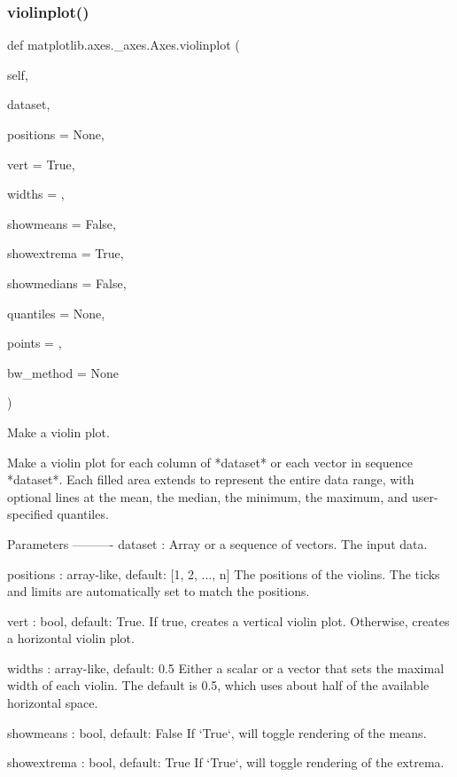 \begin{DoxyVerb}
\subsubsection{\texorpdfstring{violinplot()}{violinplot()}}
{\footnotesize\ttfamily def matplotlib.\+axes.\+\_\+axes.\+Axes.\+violinplot (\begin{DoxyParamCaption}\item[{}]{self,  }\item[{}]{dataset,  }\item[{}]{positions = {\ttfamily None},  }\item[{}]{vert = {\ttfamily True},  }\item[{}]{widths = {},  }\item[{}]{showmeans = {\ttfamily False},  }\item[{}]{showextrema = {\ttfamily True},  }\item[{}]{showmedians = {\ttfamily False},  }\item[{}]{quantiles = {\ttfamily None},  }\item[{}]{points = {},  }\item[{}]{bw\+\_\+method = {\ttfamily None} }\end{DoxyParamCaption})}

\begin{DoxyVerb}Make a violin plot.

Make a violin plot for each column of *dataset* or each vector in
sequence *dataset*.  Each filled area extends to represent the
entire data range, with optional lines at the mean, the median,
the minimum, the maximum, and user-specified quantiles.

Parameters
----------
dataset : Array or a sequence of vectors.
  The input data.

positions : array-like, default: [1, 2, ..., n]
  The positions of the violins. The ticks and limits are
  automatically set to match the positions.

vert : bool, default: True.
  If true, creates a vertical violin plot.
  Otherwise, creates a horizontal violin plot.

widths : array-like, default: 0.5
  Either a scalar or a vector that sets the maximal width of
  each violin. The default is 0.5, which uses about half of the
  available horizontal space.

showmeans : bool, default: False
  If `True`, will toggle rendering of the means.

showextrema : bool, default: True
  If `True`, will toggle rendering of the extrema.


\end{DoxyVerb}
\end{DoxyVerb}
